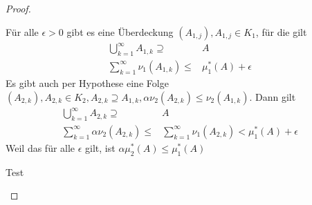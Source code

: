 \begin{proof}
	\begin{parts}
	\item F\"{u}r alle $\epsilon>0$ gibt es eine Überdeckung $(A_{1,j}),A_{1,j}\in K_1$, f\"{u}r die gilt
		 \begin{align*}
			 \bigcup_{k=1}^\infty A_{1,k}\supseteq& A\\
			 \sum_{k=1}^{\infty} \nu_1(A_{1,k})\le& \mu_1^*(A)+\epsilon 
		\end{align*}
		Es gibt auch per Hypothese eine Folge $(A_{2,k}), A_{2,k}\in K_2, A_{2,k}\supseteq A_{1,k}, \alpha\nu_2(A_{2,k})\le \nu_2(A_{1,k})$. Dann gilt
		\begin{align*}
			\bigcup_{k=1} ^\infty A_{2,k}\supseteq& A\\
			\sum_{k=1}^{\infty} \alpha\nu_2(A_{2,k})\le& \sum_{k=1}^{\infty} \nu_1(A_{2,k})<\mu_1^*(A)+\epsilon
		\end{align*}
		Weil das f\"{u}r alle $\epsilon$ gilt, ist $\alpha\mu_2^*(A)\le \mu_1^*(A)$
	\item Test
	\end{parts}
\end{proof}
